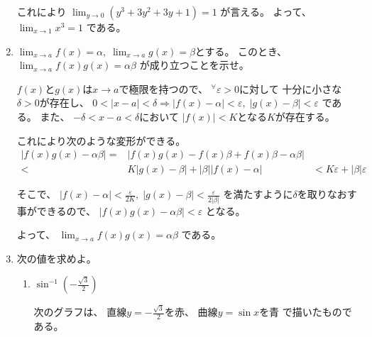 \documentclass[12pt,b5paper]{ltjsarticle}
\begin{document}
\begin{enumerate}
      これにより
      $\displaystyle \lim_{y\to 0}(y^{3}+3y^{2}+3y+1) = 1$
      が言える。
      よって、
      $\displaystyle \lim_{x\to 1}x^{3} = 1$
      である。

      \hrulefill
 \item
      $\displaystyle \lim_{x\to a}f(x) = \alpha,\; \lim_{x\to a}g(x) = \beta$とする。
      このとき、
      $\displaystyle \lim_{x\to a} f(x)g(x) = \alpha\beta$
      が成り立つことを示せ。

      \dotfill

      $f(x)$と$g(x)$は$x\to a$で極限を持つので、
      ${}^{\forall}\varepsilon >0$に対して
      十分に小さな$\delta>0$が存在し、
      $0< \lvert x-a \rvert < \delta \Rightarrow \lvert f(x)-\alpha \rvert <\varepsilon ,\; \lvert g(x)-\beta \rvert < \varepsilon$
      である。
      また、
      $-\delta < x-a < \delta$において
      $\lvert f(x) \rvert <K$となる$K$が存在する。

      これにより次のような変形ができる。
      \begin{align}
       \lvert f(x)g(x) - \alpha\beta \rvert
        = & \lvert f(x)g(x) - f(x)\beta + f(x)\beta -\alpha\beta \rvert\\
        < & K \lvert g(x) - \beta \rvert
               + \lvert \beta \rvert \lvert f(x) -\alpha \rvert
         & < K \varepsilon + \lvert \beta \rvert \varepsilon
      \end{align}

      そこで、
      $\lvert f(x)-\alpha \rvert < \frac{\varepsilon}{2K} ,\; \lvert g(x)-\beta \rvert < \frac{\varepsilon}{2\lvert \beta \rvert}$
      を満たすように$\delta$を取りなおす事ができるので、
      $\lvert f(x)g(x) - \alpha\beta \rvert < \varepsilon$
      となる。

      よって、
      $\displaystyle \lim_{x\to a} f(x)g(x) = \alpha\beta$
      である。

      \hrulefill
 \item
      次の値を求めよ。
      \begin{enumerate}
       \item
            $\displaystyle \sin^{-1}{\left( -\frac{\sqrt{3}}{2} \right)}$

            \dotfill

            次のグラフは、
            直線$y=-\frac{\sqrt{3}}{2}$を赤、
            曲線$y=\sin{x}$を青
            で描いたものである。



\end{enumerate}
\end{enumerate}
\end{document}
